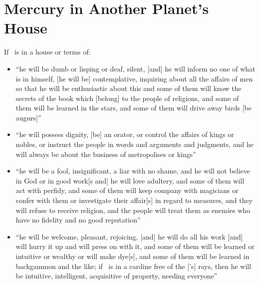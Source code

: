 \section{Mercury in Another Planet's House}
If \Mercury\, is in a house or terms of:
\begin{itemize}[topsep=0em,itemsep=0em]
\item[\Saturn] ``he will be dumb or lisping or deaf, silent, [and] he will inform no one of what is in himself, [he will be] contemplative, inquiring about all the affairs of men so that he will be enthusiastic about this and some of them will know the secrets of the book which [belong] to the people of religions, and some of them will be learned in the stars, and some of them will drive away birds [be augurs]''

\item[\Jupiter] ``he will possess dignity, [be] an orator, or control the affairs of kings or nobles, or instruct the people in words and arguments and judgments, and he will always be about the business of metropolises or kings''

\item[\Mars] ``he will be a fool, insignificant, a liar with no shame, and he will not believe in God or in good work[s and] he will love adultery, and some of them will act with perfidy, and some of them will keep company with magicians or confer with them or investigate their affair[s] in regard to measures, and they will refuse to receive religion, and the people will treat them as enemies who have no fidelity and no good reputation''

\item[\Venus] ``he will be welcome, pleasant, rejoicing, [and] he will do all his work [and] will hurry it up and will press on with it, and some of them will be learned or intuitive or wealthy or will make dye[s], and some of them will be learned in backgammon and the like; if \Mercury\, is in a cardine free of the [\Sun's] rays, then he will be intuitive, intelligent, acquisitive of property, needing everyone''

\end{itemize}